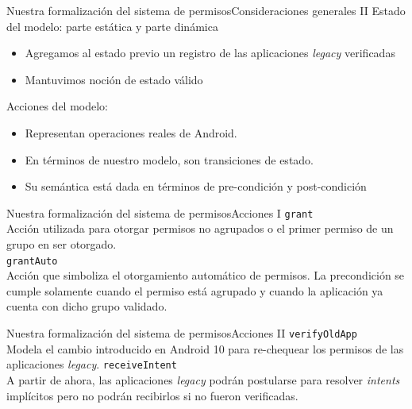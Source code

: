 \documentclass[pdf, handout]{beamer} %
\begin{document}
\begin{frame}{Nuestra formalización del sistema de permisos}{Consideraciones generales II}
    Estado del modelo: parte estática y parte dinámica
    \begin{itemize}
        \item Agregamos al estado previo un registro de las aplicaciones \textit{legacy} verificadas
        \item Mantuvimos noción de estado válido
    \end{itemize}
    \pause \vspace{20px}
    Acciones del modelo:
    \begin{itemize}
        \item Representan operaciones reales de Android.
        \item En términos de nuestro modelo, son transiciones de estado.
        \item Su semántica está dada en términos de pre-condición y post-condición
    \end{itemize}
\end{frame}

\begin{frame}{Nuestra formalización del sistema de permisos}{Acciones I}
    \texttt{grant}\\
    \vspace{5px}
    Acción utilizada para otorgar permisos no agrupados o el primer permiso de un grupo en ser
    otorgado.\\
    \pause
    \vspace{10px}
    \texttt{grantAuto}\\
    \vspace{5px}
    Acción que simboliza el otorgamiento automático de permisos. La precondición se cumple solamente
    cuando el permiso está agrupado y cuando la aplicación ya cuenta con dicho grupo validado.
\end{frame}

\begin{frame}{Nuestra formalización del sistema de permisos}{Acciones II}
    \texttt{verifyOldApp}\\
    \vspace{5px}
    Modela el cambio introducido en Android 10 para re-chequear los permisos de las aplicaciones
    \textit{legacy}.
    \pause
    \vspace{10px}
    \texttt{receiveIntent}\\
    \vspace{5px}
    A partir de ahora, las aplicaciones \textit{legacy} podrán postularse para resolver
    \textit{intents} implícitos pero no podrán recibirlos si no fueron verificadas.
\end{frame}
\end{document}
